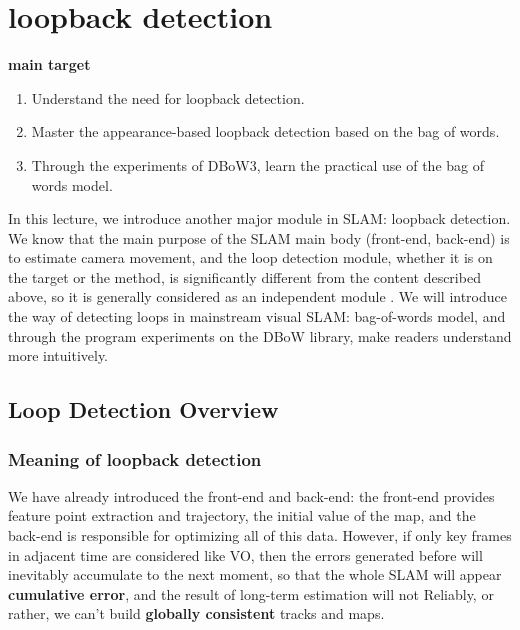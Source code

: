 \chapter{loopback detection}
\begin{mdframed}
\textbf{main target}
\begin{enumerate}[labelindent = 0em, leftmargin = 1.5em]
\item Understand the need for loopback detection.
\item Master the appearance-based loopback detection based on the bag of words.
\item Through the experiments of DBoW3, learn the practical use of the bag of words model.
\end{enumerate}
\end{mdframed}

In this lecture, we introduce another major module in SLAM: loopback detection. We know that the main purpose of the SLAM main body (front-end, back-end) is to estimate camera movement, and the loop detection module, whether it is on the target or the method, is significantly different from the content described above, so it is generally considered as an independent module . We will introduce the way of detecting loops in mainstream visual SLAM: bag-of-words model, and through the program experiments on the DBoW library, make readers understand more intuitively.

\newpage


\newpage

\section{Loop Detection Overview}
\subsection{Meaning of loopback detection}
We have already introduced the front-end and back-end: the front-end provides feature point extraction and trajectory, the initial value of the map, and the back-end is responsible for optimizing all of this data. However, if only key frames in adjacent time are considered like VO, then the errors generated before will inevitably accumulate to the next moment, so that the whole SLAM will appear \textbf{cumulative error}, and the result of long-term estimation will not Reliably, or rather, we can't build \textbf{globally consistent} tracks and maps.

